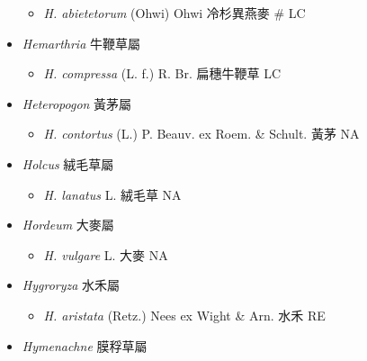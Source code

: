 \begin{itemize}
  \begin{itemize}
        \item[] \textit{H. abietetorum} (Ohwi) Ohwi  冷杉異燕麥  \# LC
  \end{itemize}
 \item[] \textit{Hemarthria} 牛鞭草屬
                                
  \begin{itemize}
        \item[] \textit{H. compressa} (L. f.) R. Br.  扁穗牛鞭草   LC
  \end{itemize}
 \item[] \textit{Heteropogon} 黃茅屬
                                
  \begin{itemize}
        \item[] \textit{H. contortus} (L.) P. Beauv. ex Roem. \& Schult.  黃茅   NA
  \end{itemize}
 \item[] \textit{Holcus} 絨毛草屬
                                
  \begin{itemize}
        \item[] \textit{H. lanatus} L.  絨毛草   NA
  \end{itemize}
 \item[] \textit{Hordeum} 大麥屬
                                
  \begin{itemize}
        \item[] \textit{H. vulgare} L.  大麥   NA
  \end{itemize}
 \item[] \textit{Hygroryza} 水禾屬
                                
  \begin{itemize}
        \item[] \textit{H. aristata} (Retz.) Nees ex Wight \& Arn.  水禾   RE
  \end{itemize}
 \item[] \textit{Hymenachne} 膜稃草屬
                                

\end{itemize}

